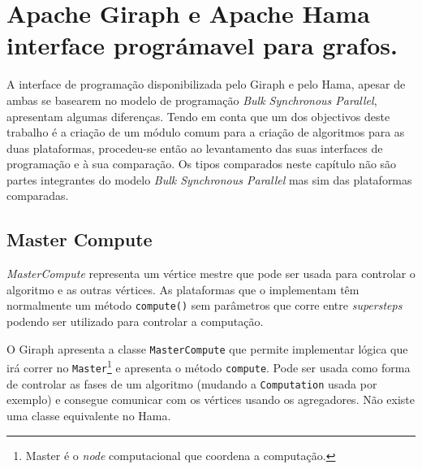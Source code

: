 \chapter{Apache Giraph e Apache Hama interface prográmavel para grafos.}

A interface de programação disponibilizada pelo Giraph e pelo Hama, apesar de ambas se basearem no modelo de programação \textit{Bulk Synchronous Parallel}, apresentam algumas diferenças. Tendo em conta que um dos objectivos deste trabalho é a criação de um módulo comum para a criação de algoritmos para as duas plataformas, procedeu-se então ao levantamento das suas interfaces de programação e à sua comparação. Os tipos comparados neste capítulo não são partes integrantes do modelo \textit{Bulk Synchronous Parallel} mas sim das plataformas comparadas.

\section{Master Compute}
\textit{MasterCompute} representa um vértice mestre que pode ser usada para controlar o algoritmo e as outras vértices. As plataformas que o implementam têm normalmente um método \texttt{compute()} sem parâmetros que corre entre \textit{supersteps} podendo ser utilizado para controlar a computação.


O Giraph apresenta a classe \texttt{MasterCompute} que permite implementar lógica que irá correr no \texttt{Master}\footnote{Master é o \textit{node} computacional que coordena a computação.} e apresenta o método \texttt{compute}. Pode ser usada como forma de controlar as fases de um algoritmo (mudando a \texttt{Computation} usada por exemplo) e consegue comunicar com os vértices usando os agregadores. Não existe uma classe equivalente no Hama.











%
